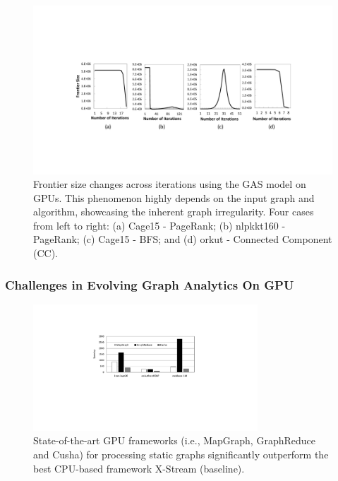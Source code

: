 

\begin{figure}[!t]
\centering
\includegraphics[width=\textwidth,height=\textheight,keepaspectratio]	{figures/frontier.pdf}
\caption{Frontier size changes across iterations using the GAS model on GPUs. This phenomenon highly depends on the input graph and algorithm, showcasing the inherent graph irregularity. Four cases from left to right: (a) Cage15 - PageRank; (b) nlpkkt160 - PageRank; (c) Cage15 - BFS; and (d) orkut - Connected Component (CC). 
 }
\label{fig:frontier}
\end{figure}

\subsubsection{Challenges in Evolving Graph Analytics On GPU}

\begin{figure}[!t]
\centering
\includegraphics[width=0.75\textwidth,height=0.75\textheight,keepaspectratio]{figures/static_GR.pdf}
\caption{State-of-the-art GPU frameworks (i.e., MapGraph, GraphReduce and Cusha) for processing static graphs significantly outperform the best CPU-based framework X-Stream (baseline).}
\label{fig:static}
\end{figure}

